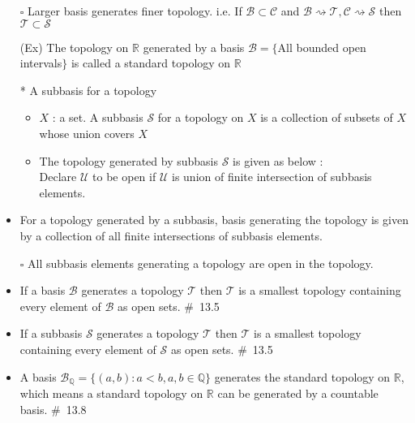 \documentclass[12pt]{article}
\newcommand{\sq}{$\square$}
\newcommand{\sptwo}{\hspace{0.2cm}}
\newcommand{\Real}{\mathbb{R}}
\begin{document}
\begin{itemize}
\begin{itemize}
	\end{itemize}
	\item[\sq] Larger basis generates finer topology. \sptwo i.e. \sptwo
	If $\mathcal{B}\subset\mathcal{C}$ and $\mathcal{B}\rightsquigarrow\mathcal{T}, \mathcal{C}\rightsquigarrow\mathcal{S}$ then $\mathcal{T}\subset\mathcal{S}$
	\item[(Ex)] The topology on $\Real$ generated by a basis $\mathcal{B}=\{$All bounded open intervals$\}$ is called a standard topology on $\Real$ 
	\item[*] A subbasis for a topology
	\begin{itemize}
		\item $X$ : a set. A subbasis $\mathcal{S}$ for a topology on $X$ is a collection of subsets of $X$ whose union covers $X$
		\item The topology generated by subbasis $\mathcal{S}$ is given as below : \\ Declare $\mathcal{U}$ to be open if $\mathcal{U}$ is union of finite intersection of subbasis elements.
	\end{itemize}
	\item For a topology generated by a subbasis, basis generating the topology is given by a collection of all finite intersections of subbasis elements. 
	\item[\sq] All subbasis elements generating a topology are open in the topology.
	\item If a basis $\mathcal{B}$ generates a topology $\mathcal{T}$ then $\mathcal{T}$ is a smallest topology containing every element of $\mathcal{B}$ as open sets. \quad \#\ 13.5
	\item If a subbasis $\mathcal{S}$ generates a topology $\mathcal{T}$ then $\mathcal{T}$ is a smallest topology containing every element of $\mathcal{S}$ as open sets. \quad \#\ 13.5
	\item A basis $\mathcal{B}_\mathbb{Q}=\{(a,b) : a<b, a,b\in \mathbb{Q}\}$ generates the standard topology on $\Real$, which means a standard topology on $\Real$ can be generated by a countable basis. \quad \#\ 13.8
\end{itemize}
\bigskip
\end{document}
